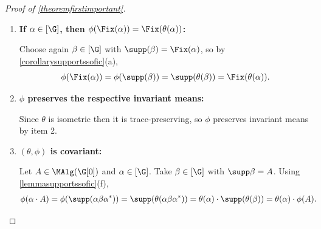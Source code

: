 \begin{proof}[Proof of \ref{theoremfirstimportant}]
\begin{enumerate}
Let $A,B\in\MAlg(\G[0])$, and consider $\alpha,\beta,\gamma\in[\G]$ with
\[\supp(\gamma)=A\cap B,\quad \supp(\alpha)=A\setminus B,\quad\text{and}\quad\supp(\beta)=B\setminus A.\]
By \ref{corollarysupportssofic}(b) and \ref{lemmasupportssofic}(e), the supports of $\theta(\gamma)$ and $\theta(\alpha)$ are disjoint and
\[\supp(\theta(\gamma\alpha))=\supp(\theta(\gamma)\theta(\alpha))=\supp(\theta(\gamma))\lor\supp(\theta(\alpha)),\]
and similarly for $\gamma$ and $\beta$. Lemma \ref{lemmasupportssofic}(e) also implies that
\[\supp(\gamma\alpha)=A\quad\text{and}\quad\supp(\gamma\beta)=B,\]
so again by \ref{corollarysupportssofic}(b), and using distributivity of meets and joins,
\begin{align*}
\phi(A)\land\phi(B)&=\supp(\theta(\gamma\alpha))\land\supp(\theta(\gamma\beta))\\
&=\left(\supp(\theta(\gamma))\lor\supp(\theta(\alpha))\right)\land\left(\supp(\theta(\gamma))\lor\supp(\theta(\beta))\right)\\
&=\supp(\theta(\gamma))=\phi(A\cap B).
\end{align*}
%

\item{\bf If $\alpha\in{[\G]}$, then $\phi(\Fix(\alpha))=\Fix(\theta(\alpha))$:}

Choose again $\beta\in[\G]$ with $\supp(\beta)=\Fix(\alpha)$, so by \ref{corollarysupportssofic}(a),
\[\phi(\Fix(\alpha))=\phi(\supp(\beta))=\supp(\theta(\beta))=\Fix(\theta(\alpha)).\]
%

\item{\bf$\phi$ preserves the respective invariant means:}

Since $\theta$ is isometric then it is trace-preserving, so $\phi$ preserves invariant means by item 2.

\item{\bf$(\theta,\phi)$ is covariant:}

Let $A\in\MAlg(\G[0])$ and $\alpha\in[\G]$. Take $\beta\in[\G]$ with $\supp\beta=A$. Using \ref{lemmasupportssofic}(f),
\begin{align*}
\phi(\alpha\cdot A)&=\phi(\supp(\alpha\beta\alpha^*))=\supp(\theta(\alpha\beta\alpha^*))=\theta(\alpha)\cdot\supp(\theta(\beta))=\theta(\alpha)\cdot\phi(A).
\end{align*}


\end{enumerate}
\end{proof}
